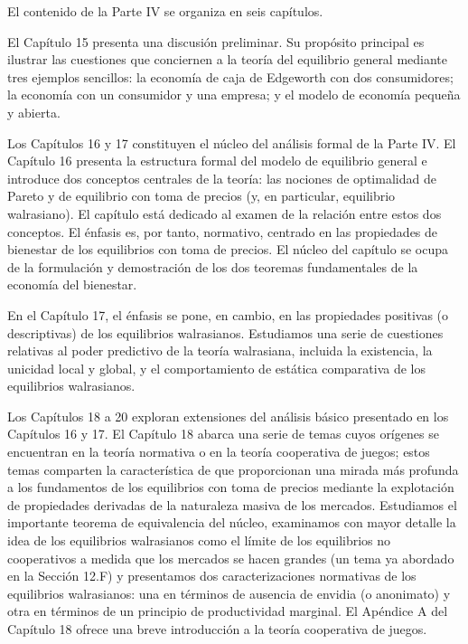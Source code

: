 \documentclass[10pt,a4paper]{article}
\begin{document}
El contenido de la Parte IV se organiza en seis capítulos.

El Capítulo 15 presenta una discusión preliminar. Su propósito principal es ilustrar las cuestiones que conciernen a la teoría del equilibrio general mediante tres ejemplos sencillos: la economía de caja de Edgeworth con dos consumidores; la economía con un consumidor y una empresa; y el modelo de economía pequeña y abierta.

Los Capítulos 16 y 17 constituyen el núcleo del análisis formal de la Parte IV. El Capítulo 16 presenta la estructura formal del modelo de equilibrio general e introduce dos conceptos centrales de la teoría: las nociones de optimalidad de Pareto y de equilibrio con toma de precios (y, en particular, equilibrio walrasiano). El capítulo está dedicado al examen de la relación entre estos dos conceptos. El énfasis es, por tanto, normativo, centrado en las propiedades de bienestar de los equilibrios con toma de precios. El núcleo del capítulo se ocupa de la formulación y demostración de los dos teoremas fundamentales de la economía del bienestar.

En el Capítulo 17, el énfasis se pone, en cambio, en las propiedades positivas (o descriptivas) de los equilibrios walrasianos. Estudiamos una serie de cuestiones relativas al poder predictivo de la teoría walrasiana, incluida la existencia, la unicidad local y global, y el comportamiento de estática comparativa de los equilibrios walrasianos.

Los Capítulos 18 a 20 exploran extensiones del análisis básico presentado en los Capítulos 16 y 17. El Capítulo 18 abarca una serie de temas cuyos orígenes se encuentran en la teoría normativa o en la teoría cooperativa de juegos; estos temas comparten la característica de que proporcionan una mirada más profunda a los fundamentos de los equilibrios con toma de precios mediante la explotación de propiedades derivadas de la naturaleza masiva de los mercados. Estudiamos el importante teorema de equivalencia del núcleo, examinamos con mayor detalle la idea de los equilibrios walrasianos como el límite de los equilibrios no cooperativos a medida que los mercados se hacen grandes (un tema ya abordado en la Sección 12.F) y presentamos dos caracterizaciones normativas de los equilibrios walrasianos: una en términos de ausencia de envidia (o anonimato) y otra en términos de un principio de productividad marginal. El Apéndice A del Capítulo 18 ofrece una breve introducción a la teoría cooperativa de juegos.
\end{document}
